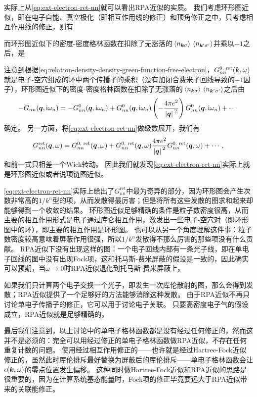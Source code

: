 实际上从\eqref{eq:ext-electron-ret-nn}就可以看出RPA近似的实质。
我们考虑环形图近似，即在电子自能、真空极化（即相互作用线的修正）和顶角修正之中，只考虑相互作用线的修正，则有

而环形图近似下的密度-密度格林函数在扣除了无涨落的$\expval*{n_{\vb*{k} \sigma}} \expval*{n_{\vb*{k}' \sigma'}}$并乘以$-1$之后，是

注意到根据\eqref{eq:relation-density-density-green-function-free-electron}，$G^\text{0, ret}_{nn}(\vb*{k}, \omega)$就是电子-空穴组成的环中两个传播子的乘积（没有加闭合费米子回线导致的$-1$因子），环形图近似下的密度-密度格林函数在扣除了无涨落的$\expval*{n_{\vb*{k} \sigma}} \expval*{n_{\vb*{k}' \sigma'}}$之后由
\[
    - G_{nn}(\vb*{q}, \mathrm{i} \omega_n) = - G_{nn}^0(\vb*{q}, \mathrm{i} \omega_n) + G_{nn}^0(\vb*{q}, \mathrm{i} \omega_n) \left( - \frac{4 \pi e^2}{\abs*{\vb*{q}}^2} \right) G_{nn}^0(\vb*{q}, \mathrm{i} \omega_n) + \cdots
\]
确定。
另一方面，将\eqref{eq:ext-electron-ret-nn}做级数展开，我们有
\[
    G^\text{ret}_{nn}(\vb*{q}, \omega) = G^\text{0, ret}_{nn}(\vb*{q}, \omega) + G^\text{0, ret}_{nn}(\vb*{q}, \omega) \frac{4\pi e^2}{\abs*{\vb*{q}}^2} G^\text{0, ret}_{nn}(\vb*{q}, \omega) + \cdots,
\]
和前一式只相差一个Wick转动。
因此我们就发现\eqref{eq:ext-electron-ret-nn}实际上就是环形图近似或者说项链图近似。

\eqref{eq:ext-electron-ret-nn}实际上给出了$G^\text{ret}_{nn}$中最为奇异的部分，因为环形图会产生次数非常高的$1/k^n$型的项，从而发散得最厉害；但是将所有这些发散的图求和起来却能够得到一个收敛的结果。
环形图近似足够精确的条件是粒子数密度很高，从而主要的相互作用形式是电子通过库仑相互作用，激发出一些电子-空穴对（即环形图中的环），即主要的相互作用是环形图。
也可以从另一个角度理解这件事：粒子数密度较高意味着屏蔽作用很强，所以$1/k^n$发散得不那么厉害的那些项没有什么贡献。
RPA近似下没有出现这样的图：一个电子回线内部有一条光子线，即在单电子回线的图中没有出现Fock项，这和托马斯-费米屏蔽的假设是一致的，因此确实可以预期，当$\omega \to 0$时RPA近似退化到托马斯-费米屏蔽上。

如果我们只计算两个电子交换一个光子，即发生一次库伦散射的图，那么会得到发散；RPA近似提供了一个足够好的方法能够消除这种发散。
由于RPA近似不再只讨论单电子传播子的修正，它可以用于讨论电子关联。
只要高密度电子气的假设成立，RPA近似就是足够精确的。

最后我们注意到，以上讨论中的单电子格林函数都是没有经过任何修正的，然而这并不是必须的：完全可以用经过修正的单电子格林函数做RPA近似，不存在任何重复计数的问题。
使用经过相互作用修正的——也许就是经过Hartree-Fock近似修正的，虽然此时库伦排斥最好替换为屏蔽后的库伦排斥——单电子格林函数会让$\epsilon(\vb*{k}, \omega)$的零点位置发生偏移。
这种同时做Hartree-Fock近似和RPA近似的思路是很重要的，因为在计算系统基态能量时，Fock项的修正毕竟要远大于RPA近似带来的关联能修正。

